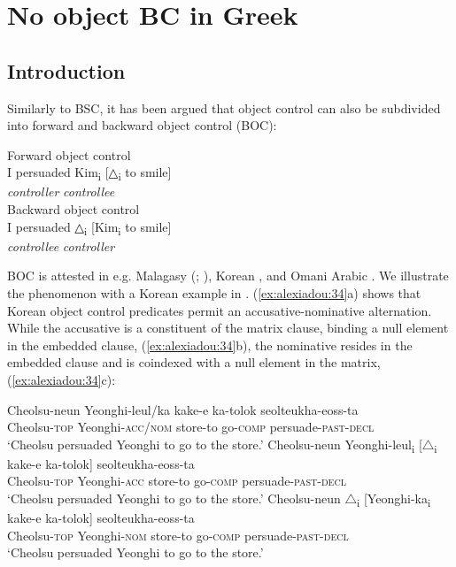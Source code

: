 \documentclass[output=paper]{langsci/langscibook}
\begin{document}
\section{No object BC in Greek} 

\subsection{Introduction}
Similarly to BSC, it has been argued that object control can also be subdivided into forward and backward object control (BOC):

\ea%
    \label{ex:alexiadou:33}
    \ea Forward object control\\
    \gll I persuaded   Kim\textsubscript{i}     [{△\textsubscript{i}} to smile]  \\
         {}   {}       \textit{controller}         \textit{controllee}\\
    \ex Backward object control\\
    \gll I persuaded  △\textsubscript{i}    [Kim\textsubscript{i}    to smile]  \\
        {}    {}       \textit{controllee}  \textit{controller}\\
        \z
\z

BOC is attested in e.g. Malagasy (\citealt{Potsdam2006Backward}; \citeyear{Potsdam2009}), Korean \citep{Monahan2003}, and Omani Arabic \citep{Al-Balushi2008}. We illustrate the phenomenon with a Korean example in . (\ref{ex:alexiadou:34}a) shows that Korean object control predicates permit an accusative-nominative alternation. While the accusative is a constituent of the matrix clause, binding a null element in the embedded clause, (\ref{ex:alexiadou:34}b), the nominative resides in the embedded clause and is coindexed with a null element in the matrix, (\ref{ex:alexiadou:34}c):
 
\ea%
    \label{ex:alexiadou:34}
    \ea\gll Cheolsu-neun  Yeonghi-leul/ka     kake-e    ka-tolok   seolteukha-eoss-ta\\
            Cheolsu-\textsc{top}     Yeonghi-\textsc{acc/nom}   store-to  go-\textsc{comp}   persuade-\textsc{past-decl}\\
    \glt    ‘Cheolsu persuaded Yeonghi to go to the store.’
    \ex
    \gll Cheolsu-neun Yeonghi-leul\textsubscript{i} [${\bigtriangleup}$\textsubscript{i} kake-e     ka-tolok]  seolteukha-eoss-ta\\
             Cheolsu-\textsc{top}    Yeonghi-\textsc{acc}    {}      store-to   go-\textsc{comp}   persuade-\textsc{past-decl}\\
    \glt     ‘Cheolsu persuaded Yeonghi to go to the store.’     
    \ex
    \gll Cheolsu-neun ${\bigtriangleup}$\textsubscript{i} [Yeonghi-ka\textsubscript{i}    kake-e    ka-tolok]  seolteukha-eoss-ta\\
             Cheolsu-\textsc{top}  {}       Yeonghi-\textsc{nom}    store-to  go-\textsc{comp}      persuade-\textsc{past-decl}\\
    \glt     ‘Cheolsu persuaded Yeonghi to go to the store.’ 
    \z
\z
\end{document}
